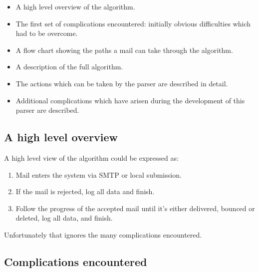 \documentclass[a4paper,12pt,draft]{article}
\begin{document}
\begin{itemize}

    \item A high level overview of the algorithm.

    \item The first set of complications encountered: initially obvious
        difficulties which had to be overcome.

    \item A flow chart showing the paths a mail can take through the
        algorithm.

    \item A description of the full algorithm.

    \item The actions which can be taken by the parser are described in
        detail.

    \item Additional complications which have arisen during the development
        of this parser are described.

\end{itemize}

\subsection{A high level overview}

A high level view of the algorithm could be expressed as:

\begin{enumerate}

    \item Mail enters the system via SMTP or local submission.

    \item If the mail is rejected, log all data and finish.

    \item Follow the progress of the accepted mail until it's either
        delivered, bounced or deleted, log all data, and finish.

\end{enumerate}

Unfortunately that ignores the many complications encountered.


\subsection{Complications encountered}

\label{complications}
\end{document}

